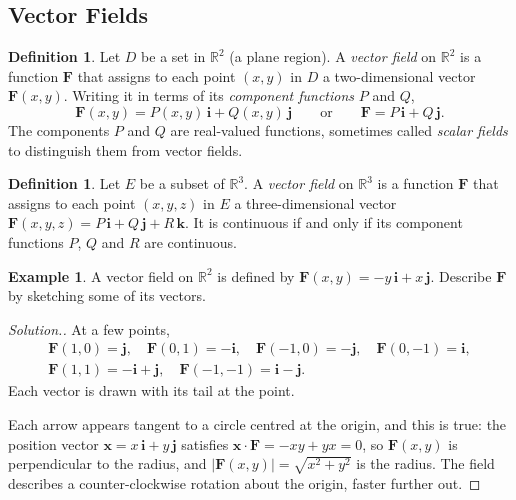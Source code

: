 \documentclass[11pt,a4paper]{article}
\theoremstyle{definition}
\newtheorem{defn}[thm]{Definition}
\newtheorem{exa}[thm]{Example}
\newenvironment{solution}
  {\renewcommand{\qedsymbol}{}\begin{proof}[\textit{Solution}.]}
  {\end{proof}}
\begin{document}
{\color[wave]{485}\subsection{Vector Fields}}

\begin{defn}
\label{defn:vectorfield2}
Let $D$ be a set in $\mathbb{R}^2$ (a plane region). A \emph{vector field} on
$\mathbb{R}^2$ is a function $\mathbf F$ that assigns to each point $(x,y)$ in
$D$ a two-dimensional vector $\mathbf F(x,y)$. Writing it in terms of its
\emph{component functions} $P$ and $Q$,
\[\mathbf F(x,y) = P(x,y)\,\mathbf i + Q(x,y)\,\mathbf j\qquad\text{or}\qquad
\mathbf F = P\,\mathbf i + Q\,\mathbf j .\]
The components $P$ and $Q$ are real-valued functions, sometimes called
\emph{scalar fields} to distinguish them from vector fields.
\end{defn}

\begin{defn}
\label{defn:vectorfield3}
Let $E$ be a subset of $\mathbb{R}^3$. A \emph{vector field} on $\mathbb{R}^3$ is
a function $\mathbf F$ that assigns to each point $(x,y,z)$ in $E$ a
three-dimensional vector $\mathbf F(x,y,z) = P\,\mathbf i + Q\,\mathbf j +
R\,\mathbf k$. It is continuous if and only if its component functions $P$, $Q$
and $R$ are continuous.
\end{defn}

\begin{exa}
\label{ex:rotationfield}
A vector field on $\mathbb{R}^2$ is defined by $\mathbf F(x,y) = -y\,\mathbf i +
x\,\mathbf j$. Describe $\mathbf F$ by sketching some of its vectors.
\end{exa}

\begin{solution}
At a few points,
\begin{gather*}
\mathbf F(1,0) = \mathbf j,\quad \mathbf F(0,1) = -\mathbf i,\quad
\mathbf F(-1,0) = -\mathbf j,\quad \mathbf F(0,-1) = \mathbf i,\\
\mathbf F(1,1) = -\mathbf i + \mathbf j,\quad \mathbf F(-1,-1) = \mathbf i - \mathbf j .
\end{gather*}
Each vector is drawn with its tail at the point.

\begin{figure}[H]
\centering
{}
\end{figure}

Each arrow appears tangent to a circle centred at the origin, and this is true:
the position vector $\mathbf x = x\,\mathbf i + y\,\mathbf j$ satisfies
$\mathbf x\cdot\mathbf F = -xy + yx = 0$, so $\mathbf F(x,y)$ is perpendicular
to the radius, and $|\mathbf F(x,y)| = \sqrt{x^2 + y^2}$ is the radius. The field
describes a counter-clockwise rotation about the origin, faster further out.
\end{solution}
\end{document}
